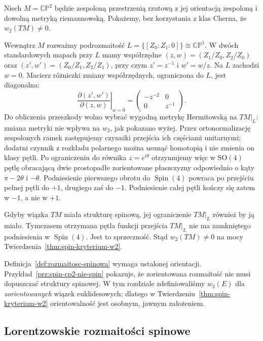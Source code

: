 \begin{przyklad}
\label{prz:spin-cp2-nie-spin}
Niech $M=\mathbb{CP}^2$ będzie zespoloną przestrzenią
rzutową z jej orientacją zespoloną i dowolną metryką
riemannowską. Pokażemy, bez korzystania z klas Cherna,
że $w_2(TM)\ne0$.

Wewnątrz $M$ rozważmy podrozmaitość
$L=\{[Z_0:Z_1:0]\}\cong\mathbb{CP}^1$.
W dwóch standardowych mapach przy $L$ mamy
współrzędne $(z,w)=(Z_1/Z_0,Z_2/Z_0)$ oraz
$(z',w')=(Z_0/Z_1,Z_2/Z_1)$, przy czym
$z'=z^{-1}$ i $w'=w/z$. Na $L$ zachodzi $w=0$.
Macierz różniczki zmiany współrzędnych,
ograniczona do $L$, jest diagonalna:
\[
 \left.\frac{\partial(z',w')}{\partial(z,w)}\right|_{w=0}
 =\begin{pmatrix}-z^{-2}&0\\0&z^{-1}\end{pmatrix}.
\]
Do obliczenia przeszkody wolno wybrać wygodną metrykę
Hermitowską na $TM|_L$: zmiana metryki nie wpływa na
$w_2$, jak pokazano wyżej. Przez ortonormalizację
zespolonych ramek zastępujemy czynniki przejścia
ich częściami unitarnymi; dodatni czynnik z rozkładu
polarnego można usunąć homotopią i nie zmienia on
klasy pętli. Po ograniczeniu do równika $z=e^{i\theta}$
otrzymujemy więc w $\mathrm{SO}(4)$ pętlę obracającą
dwie prostopadłe zorientowane
płaszczyzny odpowiednio o kąty
$\pi-2\theta$ i $-\theta$. Podniesienie pierwszego
obrotu do $\operatorname{Spin}(4)$ powraca po
przejściu pełnej pętli do $+1$, drugiego zaś
do $-1$. Podniesienie całej pętli kończy się
zatem w $-1$, a nie w $+1$.

Gdyby wiązka $TM$ miała strukturę spinową,
jej ograniczenie $TM|_L$ również by ją miało.
Tymczasem otrzymana pętla funkcji przejścia
$TM|_L$ nie ma zamkniętego podniesienia
w $\operatorname{Spin}(4)$. Jest to sprzeczność.
Stąd $w_2(TM)\ne0$ na mocy
Twierdzenia~\ref{thm:spin-kryterium-w2}.
\end{przyklad}

\begin{uwaga}
Definicja~\ref{def:rozmaitosc-spinowa} wymaga
ustalonej orientacji. Przykład~\ref{prz:spin-cp2-nie-spin}
pokazuje, że zorientowana rozmaitość nie musi
dopuszczać struktury spinowej. W tym rozdziale
zdefiniowaliśmy $w_2(E)$ dla \emph{zorientowanych}
wiązek euklidesowych; dlatego w
Twierdzeniu~\ref{thm:spin-kryterium-w2}
orientowalność jest osobnym, jawnym założeniem.
\end{uwaga}

\subsection{Lorentzowskie rozmaitości spinowe}

